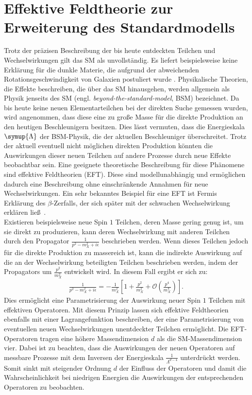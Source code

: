 \section{Effektive Feldtheorie zur Erweiterung des Standardmodells}
Trotz der präzisen Beschreibung der bis heute entdeckten Teilchen und Wechselwirkungen gilt das SM als unvollständig. Es liefert beispielsweise keine Erklärung für die dunkle Materie, die aufgrund der abweichenden Rotationsgeschwindigkeit von Galaxien postuliert wurde \cite{Bertone:2016nfn}. Physikalische Theorien, die Effekte beschreiben, die über das SM hinausgehen, werden allgemein als Physik jenseits des SM (engl. \textit{beyond-the-standard-model}, BSM) bezeichnet. Da bis heute keine neuen Elementarteilchen bei der direkten Suche gemessen wurden, wird angenommen, dass diese eine zu große Masse für die direkte Produktion an den heutigen Beschleunigern besitzen. Dies lässt vermuten, dass die Energieskala $\symup{\Lambda}$ der BSM-Physik, die der aktuellen Beschleuniger überschreitet. Trotz der aktuell eventuell nicht möglichen direkten Produktion könnten die Auswirkungen dieser neuen Teilchen auf andere Prozesse durch neue Effekte beobachtbar sein. Eine geeignete theoretische Beschreibung für diese Phänomene sind effektive Feldtheorien (EFT). Diese sind modellunabhängig und ermöglichen dadurch eine Beschreibung ohne einschränkende Annahmen für neue Wechselwirkungen. Ein sehr bekanntes Beispiel für eine EFT ist Fermis Erklärung des $\beta$-Zerfalls, der sich später mit der schwachen Wechselwirkung erklären ließ~\cite{Fermi1934}.\\
Existieren beispielsweise neue Spin $1$ Teilchen, deren Masse gering genug ist, um sie direkt zu produzieren, kann deren Wechselwirkung mit anderen Teilchen durch den Propagator $\frac{1}{p^2 -m_X^2+i\epsilon}$ beschrieben werden. Wenn dieses Teilchen jedoch für die direkte Produktion zu massereich ist, kann die indirekte Auswirkung auf die an der Wechselwirkung beteiligten Teilchen beschrieben werden, indem der Propagators um $\frac{p^2}{m_X^2}$ entwickelt wird. In diesem Fall ergibt er sich zu:
\begin{align}
    \frac{1}{p^2 -m_X^2 + i\epsilon} = -\frac{1}{m_X^2}\left[ 1 + \frac{p^2}{m_X^2} + \mathcal{O}\left(\frac{p^4}{m_X^4}\right)\right].
\end{align}
Dies ermöglicht eine Parametrisierung der Auswirkung neuer Spin $1$ Teilchen mit effektiven Operatoren.
Mit diesem Prinzip lassen sich effektive Feldtheorien ebenfalls mit einer Lagrangefunktion beschreiben, der eine Parametrisierung von eventuellen neuen Wechselwirkungen unentdeckter Teilchen ermöglicht. Die EFT-Operatoren tragen eine höhere Massendimension $d$ als die SM-Massendimension vier. Dabei ist zu beachten, dass die Auswirkungen der neuen Operatoren auf messbare Prozesse mit dem Inversen der Energieskala $\frac{1}{\Lambda^{d-4}}$ unterdrückt werden.  Somit sinkt mit steigender Ordnung $d$ der Einfluss der Operatoren und damit die Wahrscheinlichkeit bei niedrigen Energien die Auswirkungen der entsprechenden Operatoren zu beobachten.\\
